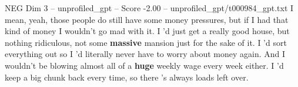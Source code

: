 \begin{textsample}{NEG Dim 3 – unprofiled\_gpt – Score -2.00 – unprofiled\_gpt/t000984\_gpt.txt}  \label{ex:f3_neg_003}
I mean, yeah, those people do still have some money pressures, but if I had that kind of money I wouldn't go mad with it.
I ’d just get a really good house, but nothing ridiculous, not some \textbf{massive} mansion just for the sake of it.
I ’d sort everything out so I ’d literally never have to worry about money again.
And I wouldn't be blowing almost all of a \textbf{huge} weekly wage every week either.
I ’d keep a big chunk back every time, so there ’s always loads left over.

\end{textsample}
